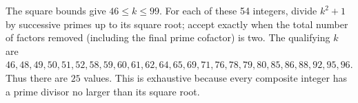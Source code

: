 The square bounds give $46\le k\le99$. For each of these 54 integers, divide $k^2+1$ by successive primes up to its square root; accept exactly when the total number of factors removed (including the final prime cofactor) is two. The qualifying $k$ are $46,48,49,50,51,52,58,59,60,61,62,64,65,69,71,76,78,79,80,85,86,88,92,95,96$. Thus there are $\boxed{25}$ values. This is exhaustive because every composite integer has a prime divisor no larger than its square root.
